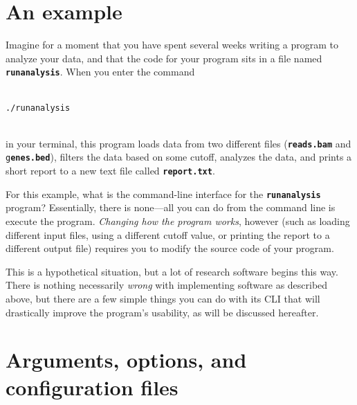 \documentclass{article}
\begin{document}
\section{An example}
Imagine for a moment that you have spent several weeks writing a program to analyze your data, and that the code for your program sits in a file named \texttt{\textbf{runanalysis}}.
When you enter the command
\\ \\
\begin{verbatim}
./runanalysis
\end{verbatim}
\\
in your terminal, this program loads data from two different files (\texttt{\textbf{reads.bam}} and \texttt{g\textbf{enes.bed}}), filters the data based on some cutoff, analyzes the data, and prints a short report to a new text file called \texttt{\textbf{report.txt}}.

For this example, what is the command-line interface for the \texttt{\textbf{runanalysis}} program?
Essentially, there is none---all you can do from the command line is execute the program.
\textit{Changing how the program works}, however (such as loading different input files, using a different cutoff value, or printing the report to a different output file) requires you to modify the source code of your program.

This is a hypothetical situation, but a lot of research software begins this way.
There is nothing necessarily \textit{wrong} with implementing software as described above, but there are a few simple things you can do with its CLI that will drastically improve the program's usability, as will be discussed hereafter.

\section{Arguments, options, and configuration files}
\end{document}
